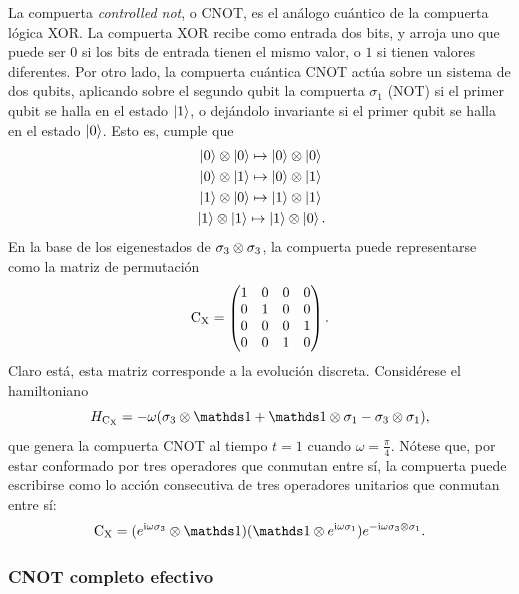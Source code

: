 La compuerta \textit{controlled not}, o CNOT, es el análogo cuántico de la compuerta lógica XOR. La compuerta XOR recibe como entrada dos bits, y arroja uno que puede ser $0$ si los bits de entrada tienen el mismo valor, o $1$ si tienen valores diferentes. Por otro lado, la compuerta cuántica CNOT actúa sobre un sistema de dos qubits, aplicando sobre el segundo qubit la compuerta $\sigma_{1}$ (NOT) si el primer qubit se halla en el estado $\ket{1}$, o dejándolo invariante si el primer qubit se halla en el estado $\ket{0}$. Esto es, cumple que \cite{Chuang}
\begin{align}
    \ket{0}\otimes\ket{0}\mapsto\ket{0}\otimes\ket{0}\nonumber\\
    \ket{0}\otimes\ket{1}\mapsto\ket{0}\otimes\ket{1}\nonumber\\
    \ket{1}\otimes\ket{0}\mapsto\ket{1}\otimes\ket{1}\nonumber\\
    \ket{1}\otimes\ket{1}\mapsto\ket{1}\otimes\ket{0} \rlap{.}\nonumber
\end{align}
En la base de los eigenestados de $\sigma_{3}\otimes\sigma_{3}$, la compuerta puede representarse como la matriz de permutación
\begin{equation}
    \text{C}_{\text{X}}=\begin{pmatrix}
        1&0&0&0\\
        0&1&0&0\\
        0&0&0&1\\
        0&0&1&0
    \end{pmatrix}.\nonumber
\end{equation}
Claro está, esta matriz corresponde a la evolución discreta. Considérese el hamiltoniano
\begin{equation}
  H_{\cnot}=-\omega(\pauli{3}\otimes\Id+\Id\otimes\pauli{1}-\pauli{3}\otimes\pauli{1}),\nonumber
\end{equation}
que genera la compuerta CNOT al tiempo $t=1$ cuando $\omega=\frac{\pi}{4}$. Nótese que, por estar conformado por tres operadores que conmutan entre sí, la compuerta puede escribirse como lo acción consecutiva de tres operadores unitarios que conmutan entre sí:
\begin{equation}
  \cnot=(e^{\rmi\omega\pauli{3}}\otimes \Id) (\Id \otimes e^{\rmi\omega\pauli{1}}) e^{-\rmi\omega\pauli{3}\otimes\pauli{1}}.\nonumber
\end{equation}

\subsubsection{CNOT completo efectivo}

